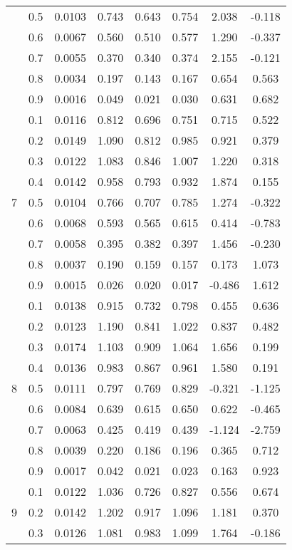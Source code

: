 \documentclass[11pt,a4paper]{report}
\begin{document}
\begin{longtable}{ | c | c || c | c | c | c | c | c | }
 & 0.5 & 0.0103 & 0.743 & 0.643 & 0.754 & 2.038 & -0.118 \\
 & 0.6 & 0.0067 & 0.560 & 0.510 & 0.577 & 1.290 & -0.337 \\
 & 0.7 & 0.0055 & 0.370 & 0.340 & 0.374 & 2.155 & -0.121 \\
 & 0.8 & 0.0034 & 0.197 & 0.143 & 0.167 & 0.654 & 0.563 \\
 & 0.9 & 0.0016 & 0.049 & 0.021 & 0.030 & 0.631 & 0.682 \\
 \hline
\multirow{9}{*}{7} & 0.1 & 0.0116 & 0.812 & 0.696 & 0.751 & 0.715 & 0.522 \\
 & 0.2 & 0.0149 & 1.090 & 0.812 & 0.985 & 0.921 & 0.379 \\
 & 0.3 & 0.0122 & 1.083 & 0.846 & 1.007 & 1.220 & 0.318 \\
 & 0.4 & 0.0142 & 0.958 & 0.793 & 0.932 & 1.874 & 0.155 \\
 & 0.5 & 0.0104 & 0.766 & 0.707 & 0.785 & 1.274 & -0.322 \\
 & 0.6 & 0.0068 & 0.593 & 0.565 & 0.615 & 0.414 & -0.783 \\
 & 0.7 & 0.0058 & 0.395 & 0.382 & 0.397 & 1.456 & -0.230 \\
 & 0.8 & 0.0037 & 0.190 & 0.159 & 0.157 & 0.173 & 1.073 \\
 & 0.9 & 0.0015 & 0.026 & 0.020 & 0.017 & -0.486 & 1.612 \\
 \hline
\multirow{9}{*}{8} & 0.1 & 0.0138 & 0.915 & 0.732 & 0.798 & 0.455 & 0.636 \\
 & 0.2 & 0.0123 & 1.190 & 0.841 & 1.022 & 0.837 & 0.482 \\
 & 0.3 & 0.0174 & 1.103 & 0.909 & 1.064 & 1.656 & 0.199 \\
 & 0.4 & 0.0136 & 0.983 & 0.867 & 0.961 & 1.580 & 0.191 \\
 & 0.5 & 0.0111 & 0.797 & 0.769 & 0.829 & -0.321 & -1.125 \\
 & 0.6 & 0.0084 & 0.639 & 0.615 & 0.650 & 0.622 & -0.465 \\
 & 0.7 & 0.0063 & 0.425 & 0.419 & 0.439 & -1.124 & -2.759 \\
 & 0.8 & 0.0039 & 0.220 & 0.186 & 0.196 & 0.365 & 0.712 \\
 & 0.9 & 0.0017 & 0.042 & 0.021 & 0.023 & 0.163 & 0.923 \\
 \hline
\multirow{9}{*}{9} & 0.1 & 0.0122 & 1.036 & 0.726 & 0.827 & 0.556 & 0.674 \\
 & 0.2 & 0.0142 & 1.202 & 0.917 & 1.096 & 1.181 & 0.370 \\
 & 0.3 & 0.0126 & 1.081 & 0.983 & 1.099 & 1.764 & -0.186 \\

\end{longtable}
\end{document}
